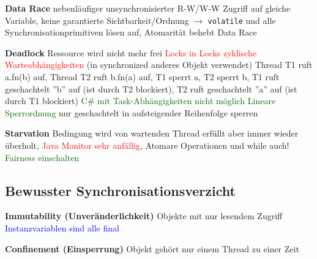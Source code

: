 \textbf{Data Race} nebenläufiger unsynchronisierter R-W/W-W Zugriff auf gleiche Variable, keine garantierte Sichtbarkeit/Ordnung $\rightarrow$ \lstinline{volatile} und alle Synchronisationprimitiven lösen auf, Atomarität behebt Data Race

\textbf{Deadlock} Ressource wird nicht mehr frei \textcolor{red}{Locks in Locks} \textcolor{red}{zyklische Warteabhängigkeiten} (in synchronized anderes Objekt verwendet) Thread T1 ruft a.fn(b) auf, Thread T2 ruft b.fn(a) auf, T1 sperrt a, T2 sperrt b, T1 ruft geschachtelt ''b'' auf (ist durch T2 blockiert), T2 ruft geschachtelt ''a'' auf (ist durch T1 blockiert) \textcolor{darkGreen}{C\# mit Task-Abhängigkeiten nicht möglich} \textcolor{darkGreen}{Lineare Sperrordnung} nur geschachtelt in aufsteigender Reihenfolge sperren


\textbf{Starvation} Bedingung wird von wartenden Thread erfüllt aber immer wieder überholt, \textcolor{red}{Java Monitor sehr anfällig}, Atomare Operationen und while auch! \textcolor{darkGreen}{Fairness einschalten}

\subsection{Bewusster Synchronisationsverzicht}

\textbf{Immutability (Unveränderlichkeit)} Objekte mit nur lesendem Zugriff \textcolor{blue}{Instanzvariablen sind alle final}

\textbf{Confinement (Einsperrung)} Objekt gehört nur einem Thread zu einer Zeit






